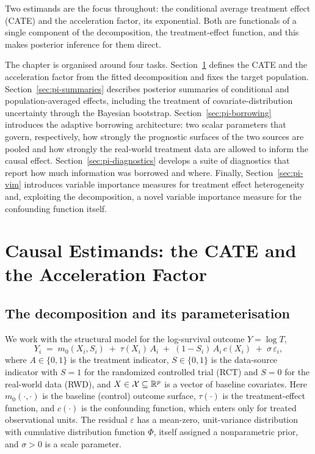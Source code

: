 Two estimands are the focus throughout: the conditional average treatment
effect (CATE) and the acceleration factor, its exponential. Both are functionals
of a single component of the decomposition, the treatment-effect function, and
this makes posterior inference for them direct.

The chapter is organised around four tasks. Section~\ref{sec:pi-estimands}
defines the CATE and the acceleration factor from the fitted decomposition and
fixes the target population. Section~\ref{sec:pi-summaries} describes posterior
summaries of conditional and population-averaged effects, including the
treatment of covariate-distribution uncertainty through the Bayesian bootstrap.
Section~\ref{sec:pi-borrowing} introduces the adaptive borrowing architecture:
two scalar parameters that govern, respectively, how strongly the prognostic
surfaces of the two sources are pooled and how strongly the real-world treatment
data are allowed to inform the causal effect.
Section~\ref{sec:pi-diagnostics} develops a suite of diagnostics that report how
much information was borrowed and where. Finally, Section~\ref{sec:pi-vim}
introduces variable importance measures for treatment effect heterogeneity and,
exploiting the decomposition, a novel variable importance measure for the
confounding function itself.

\section{Causal Estimands: the CATE and the Acceleration Factor}
\label{sec:pi-estimands}

\subsection{The decomposition and its parameterisation}

We work with the structural model for the log-survival outcome
$Y = \log T$,
\begin{equation}
\label{eq:decomposition}
Y_i \;=\; m_0(X_i, S_i) \;+\; \tau(X_i)\,A_i \;+\; (1 - S_i)\,A_i\, c(X_i)
        \;+\; \sigma\,\varepsilon_i ,
\end{equation}
where $A \in \{0,1\}$ is the treatment indicator, $S \in \{0,1\}$ is the
data-source indicator with $S = 1$ for the randomized controlled trial (RCT)
and $S = 0$ for the real-world data (RWD), and $X \in \mathcal{X} \subseteq
\mathbb{R}^p$ is a vector of baseline covariates. Here $m_0(\cdot,\cdot)$ is the
baseline (control) outcome surface, $\tau(\cdot)$ is the treatment-effect
function, and $c(\cdot)$ is the confounding function, which enters only for
treated observational units. The residual $\varepsilon$ has a mean-zero,
unit-variance distribution with cumulative distribution function $\Phi$, itself
assigned a nonparametric prior, and $\sigma > 0$ is a scale parameter.

